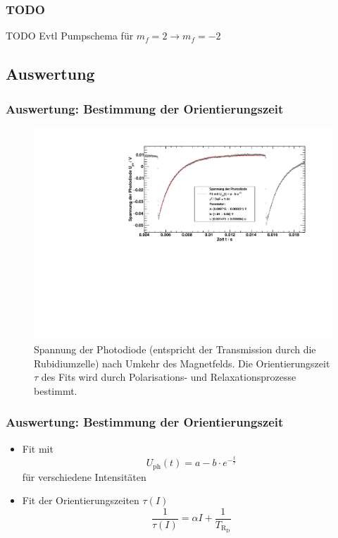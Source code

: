 \begin{frame}
\frametitle{TODO}
  TODO Evtl Pumpschema für $m_f=2 \to m_f=-2$  %
\end{frame}

\subsection{Auswertung}
\begin{frame}
\frametitle{Auswertung: Bestimmung der Orientierungszeit}
\begin{figure}
    \begin{center}
        \includegraphics[width=\textwidth]{../img/65-5mA-10.pdf}
        \caption{Spannung der Photodiode (entspricht der Transmission durch die Rubidiumzelle)
        nach Umkehr des Magnetfelds.
        Die Orientierungszeit $\tau$ des Fits wird durch Polarisations- und Relaxationsprozesse bestimmt.}
    \end{center}
\end{figure}
\end{frame}

\begin{frame}
\frametitle{Auswertung: Bestimmung der Orientierungszeit}
\begin{itemize}[<+->]
    \item Fit mit
    \begin{equation*}
        U_{\text{ph}}(t)=a - b \cdot e^{-\frac{t}{\tau}}
    \end{equation*}
    für verschiedene Intensitäten
    \item Fit der Orientierungszeiten $\tau(I)$ 
    \begin{equation*}
        \frac{1}{\tau(I)}=\alpha I + \frac{1}{T_{\text{R}_\text{D}}}
    \end{equation*}
\end{itemize}
\end{frame}

